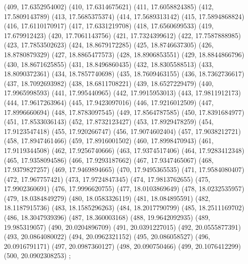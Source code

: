 {					(409, 17.6352954002)
					(410, 17.6314675621)
					(411, 17.6058824385)
					(412, 17.5809143789)
					(413, 17.5685375374)
					(414, 17.5689313142)
					(415, 17.5894868824)
					(416, 17.6110170917)
					(417, 17.6331219708)
					(418, 17.6560699533)
					(419, 17.679912423)
					(420, 17.7061143756)
					(421, 17.7324399612)
					(422, 17.7587888985)
					(423, 17.7853502623)
					(424, 18.8679172285)
					(425, 18.8746637305)
					(426, 18.8780879329)
					(427, 18.8865477573)
					(428, 18.8906853551)
					(429, 18.8844866796)
					(430, 18.8671625855)
					(431, 18.8496860435)
					(432, 18.8305588513)
					(433, 18.8090372361)
					(434, 18.7857740698)
					(435, 18.7609463155)
					(436, 18.7362736617)
					(437, 18.7092693982)
					(438, 18.6811708221)
					(439, 18.6527229479)
					(440, 17.9965998593)
					(441, 17.995440965)
					(442, 17.9915953013)
					(443, 17.9811912173)
					(444, 17.9617263964)
					(445, 17.9423097016)
					(446, 17.9216012509)
					(447, 17.8996660694)
					(448, 17.8783097545)
					(449, 17.8564787585)
					(450, 17.8391684977)
					(451, 17.8533036143)
					(452, 17.8732123427)
					(453, 17.8929478259)
					(454, 17.9123547418)
					(455, 17.920266747)
					(456, 17.9074602404)
					(457, 17.9038212721)
					(458, 17.8947461466)
					(459, 17.8916001502)
					(460, 17.8998470943)
					(461, 17.9119344508)
					(462, 17.9256740666)
					(463, 17.9374517406)
					(464, 17.9283412348)
					(465, 17.9358094586)
					(466, 17.9293187662)
					(467, 17.9347465067)
					(468, 17.9379827257)
					(469, 17.9469894665)
					(470, 17.9495365535)
					(471, 17.9584080407)
					(472, 17.967757421)
					(473, 17.9724847345)
					(474, 17.9813762655)
					(475, 17.9902360691)
					(476, 17.9996620755)
					(477, 18.0103869649)
					(478, 18.0232535957)
					(479, 18.0384849279)
					(480, 18.0583326119)
					(481, 18.084895591)
					(482, 18.1187915736)
					(483, 18.1585296263)
					(484, 18.2017790799)
					(485, 18.2511169702)
					(486, 18.3047939396)
					(487, 18.360003168)
					(488, 19.9642092935)
					(489, 19.985319057)
					(490, 20.0204896709)
					(491, 20.0391227015)
					(492, 20.0555877391)
					(493, 20.0864080022)
					(494, 20.0962321152)
					(495, 20.086058527)
					(496, 20.0916791171)
					(497, 20.0987360127)
					(498, 20.090750466)
					(499, 20.1076412299)
					(500, 20.0902308253)
				};
